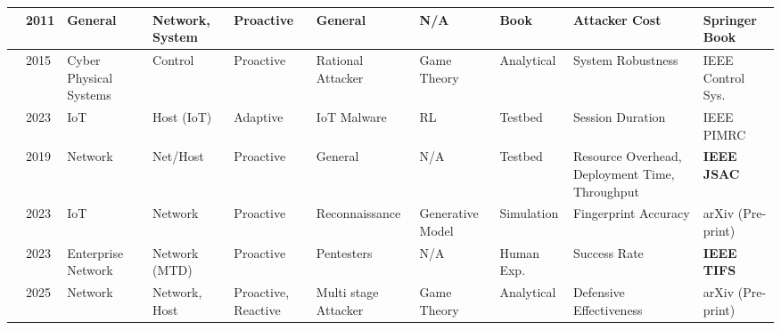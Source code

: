 \begin{landscape}
\begin{longtable}{|p{0.6cm}|p{0.8cm}|p{2.6cm}|p{2.2cm}|p{2.8cm}|p{2.5cm}|p{2cm}|p{2.5cm}|p{2.8cm}|p{3.8cm}|}
            \cite{jajodia2011moving}      & 2011          & General                  & Network, System     & Proactive                     & General                     & N/A                     & Book                       & Attacker Cost                                                    & Springer Book                          \\ \hline
            \cite{zhu2015game}            & 2015          & Cyber Physical Systems   & Control             & Proactive                     & Rational Attacker           & Game Theory             & Analytical                 & System Robustness                                                & IEEE Control Sys.                      \\ \hline
            \cite{aiipot2023}             & 2023          & IoT                      & Host (IoT)          & Adaptive                      & IoT Malware                 & RL                      & Testbed                    & Session Duration                                                 & IEEE PIMRC                             \\ \hline
            \cite{honeydoc2019}           & 2019          & Network                  & Net/Host            & Proactive                     & General                     & N/A                     & Testbed                    & Resource Overhead, Deployment Time, Throughput                   & \textbf{IEEE JSAC}                     \\ \hline
            \cite{iotflowgenerator2023}   & 2023          & IoT                      & Network             & Proactive                     & Reconnaissance              & Generative Model        & Simulation                 & Fingerprint Accuracy                                             & arXiv (Pre-print)                      \\ \hline
            \cite{dolos2023}              & 2023          & Enterprise Network       & Network (MTD)       & Proactive                     & Pentesters                  & N/A                     & Human Exp.                 & Success Rate                                                     & \textbf{IEEE TIFS}                     \\ \hline
            \cite{attackerdecision2025}   & 2025          & Network                  & Network, Host       & Proactive, Reactive           & Multi stage Attacker        & Game Theory             & Analytical                 & Defensive Effectiveness                                          & arXiv (Pre-print)                      \\ \hline

\end{longtable}
\end{landscape}
